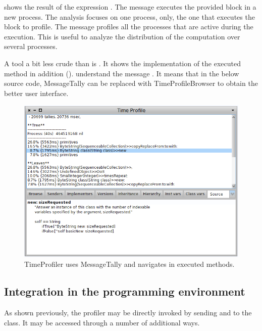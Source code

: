 \documentclass[a4paper,10pt,twoside]{book}
\begin{document}
 shows the result of the expression .
The message  executes the provided block in a new process. The analysis focuses on one process, only, the one that executes the block to profile. The message  profiles all the processes that are active during the execution. This is useful to analyze the distribution of the computation over several processes.


A tool a bit less crude than  is . It shows the implementation of the executed method in addition ().   understand the message . It means that in the below source code, MessageTally can be replaced with TimeProfileBrowser to obtain the better user interface.

\begin{figure}
	\begin{center}
	\includegraphics[width=.9\linewidth]{TimeProfiler}
	\caption{TimeProfiler uses MessageTally and navigates in executed methods.
}
	\end{center}
\end{figure}


\subsection{Integration in the programming environment}
As shown previously, the profiler may be directly invoked by sending  and  to the  class. It may be accessed through a number of additional ways.
\end{document}
